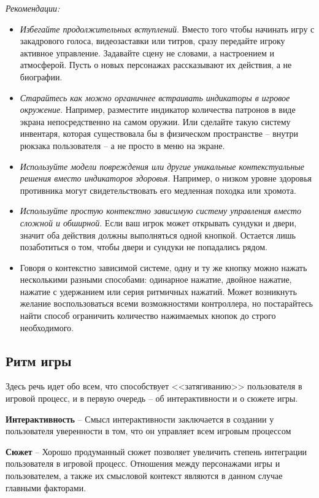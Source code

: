 \documentclass{article}
\begin{document}
\noindent\textit{Рекомендации:}
\begin{itemize}
  \item \textit{Избегайте продолжительных вступлений}. Вместо того чтобы начинать игру с закадрового голоса, видеозаставки или титров, сразу передайте игроку активное управление. Задавайте сцену не словами, а настроением и атмосферой. Пусть о новых персонажах рассказывают их действия, а не биографии.
  \item \textit{Старайтесь как можно органичнее встраивать индикаторы в игровое окружение}. Например, разместите индикатор количества патронов в виде экрана непосредственно на самом оружии. Или сделайте такую систему инвентаря, которая существовала бы в физическом пространстве -- внутри рюкзака пользователя -- а не просто в меню на экране.
  \item \textit{Используйте модели повреждения или другие уникальные контекстуальные решения вместо индикаторов здоровья}. Например, о низком уровне здоровья противника могут свидетельствовать его медленная походка или хромота.
  \item \textit{Используйте простую контекстно зависимую систему управления вместо сложной и обширной}. Если ваш игрок может открывать сундуки и двери, значит оба действия должны выполняться одной кнопкой. Остается лишь позаботиться о том, чтобы двери и сундуки не попадались рядом.
  \item Говоря о контекстно зависимой системе, одну и ту же кнопку можно нажать несколькими разными способами: одинарное нажатие, двойное нажатие, нажатие с удержанием или серия ритмичных нажатий. Может возникнуть желание воспользоваться всеми возможностями контроллера, но постарайтесь найти способ ограничить количество нажимаемых кнопок до строго необходимого.
\end{itemize}

\subsection{Ритм игры}
Здесь речь идет обо всем, что способствует <<затягиванию>> пользователя в игровой процесс, и в первую очередь -- об интерактивности и о сюжете игры.

\textbf{Интерактивность} -- Смысл интерактивности заключается в создании у пользователя уверенности в том, что он управляет всем игровым процессом

\textbf{Сюжет} -- Хорошо продуманный сюжет позволяет увеличить степень интеграции пользователя в игровой процесс. Отношения между персонажами игры и пользователем, а также их смысловой контекст являются в данном случае главными факторами.
\end{document}
